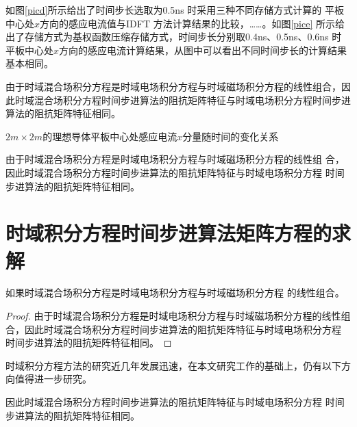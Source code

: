 \documentclass[doctor]{thesisUESTC}
\begin{document}
如图\ref{picd}所示给出了时间步长选取为0.5ns 时采用三种不同存储方式计算的
平板中心处$x$方向的感应电流值与IDFT 方法计算结果的比较，……。如图\ref{pice}
所示给出了存储方式为基权函数压缩存储方式，时间步长分别取0.4ns、0.5ns、0.6ns
时平板中心处$x$方向的感应电流计算结果，从图中可以看出不同时间步长的计算结果基本相同。

由于时域混合场积分方程是时域电场积分方程与时域磁场积分方程的线性组合，因此时域混合场积分方程时间步进算法的阻抗矩阵特征与时域电场积分方程时间步进算法的阻抗矩阵特征相同。

\begin{graphic}[h]
\caption{$2m\times 2m$的理想导体平板中心处感应电流$x$分量随时间的变化关系}
\label{fig2}
\end{graphic}


由于时域混合场积分方程是时域电场积分方程与时域磁场积分方程的线性组
合，因此时域混合场积分方程时间步进算法的阻抗矩阵特征与时域电场积分方程
时间步进算法的阻抗矩阵特征相同。
\section{时域积分方程时间步进算法矩阵方程的求解}

\begin{theorem}
如果时域混合场积分方程是时域电场积分方程与时域磁场积分方程
的线性组合。
\end{theorem}
\begin{proof}
由于时域混合场积分方程是时域电场积分方程与时域磁场积分方程的线性组
合，因此时域混合场积分方程时间步进算法的阻抗矩阵特征与时域电场积分方程
时间步进算法的阻抗矩阵特征相同。
\end{proof}
\begin{corollary}
时域积分方程方法的研究近几年发展迅速，在本文研究工作的基础上，仍有以下方向值得进一步研究。
\end{corollary}
\begin{lemma}
因此时域混合场积分方程时间步进算法的阻抗矩阵特征与时域电场积分方程
时间步进算法的阻抗矩阵特征相同。
\end{lemma}
\end{document}
